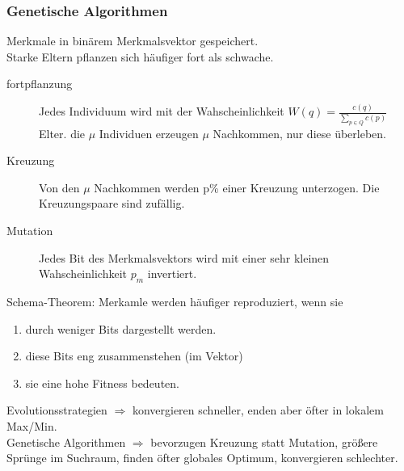 \subsubsection{Genetische Algorithmen}
Merkmale in binärem Merkmalsvektor gespeichert.\\
Starke Eltern pflanzen sich häufiger fort als schwache.\\
\begin{description}
\item[fortpflanzung] Jedes Individuum wird mit der Wahscheinlichkeit $W(q) = \frac{c(q)}{\sum\limits_{p \in Q}c(p)}$ Elter. die $\mu$ Individuen erzeugen $\mu$ Nachkommen, nur diese überleben.

\item[Kreuzung] Von den $\mu$ Nachkommen werden p\% einer Kreuzung unterzogen. Die Kreuzungspaare sind zufällig.

\item[Mutation] Jedes Bit des Merkmalsvektors wird mit einer sehr kleinen Wahscheinlichkeit $p_m$ invertiert.
\end{description}

Schema-Theorem: Merkamle werden häufiger reproduziert, wenn sie 
\begin{enumerate}
\item durch weniger Bits dargestellt werden.
\item diese Bits eng zusammenstehen (im Vektor)
\item sie eine hohe Fitness bedeuten.
\end{enumerate}

Evolutionsstrategien $\Rightarrow$ konvergieren schneller, enden aber öfter in lokalem Max/Min.\\
Genetische Algorithmen $\Rightarrow$ bevorzugen Kreuzung statt Mutation, größere Sprünge im Suchraum, finden öfter globales Optimum, konvergieren schlechter.

